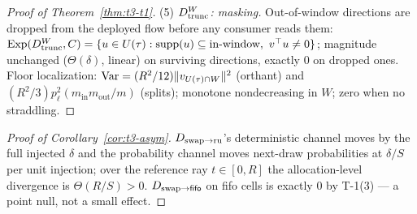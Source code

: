 \begin{proof}[Proof of Theorem~\ref{thm:t3-t1}]
(5) \emph{$\Dtrunc[W]$: masking.} Out-of-window directions are dropped from
the deployed flow before any consumer reads them:
$\Exp(\Dtrunc[W], \Ccons) = \{u \in \Utau : \mathrm{supp}(u) \subseteq
\text{in-window},\ v^{\top}u \ne 0\}$; magnitude unchanged
($\Theta(\delta)$, linear) on surviving directions, exactly 0 on dropped
ones. Floor localization: $\mathrm{Var} = (R^2/12)\|v_{\Utau \cap W}\|^2$ (orthant)
and $(R^2/3)p_\ell^2(m_{\mathrm{in}}m_{\mathrm{out}}/m)$ (splits);
monotone nondecreasing in $W$; zero when no straddling.
\end{proof}

\begin{proof}[Proof of Corollary~\ref{cor:t3-asym}]
$\Dswapru$'s deterministic channel moves  by the full
injected $\delta$ and the probability channel moves next-draw probabilities
at $\delta/S$ per unit injection; over the reference ray $t \in [0,R]$ the
allocation-level divergence is $\Theta(R/S) > 0$. $\Dswapfifo$ on fifo cells
is exactly 0 by T-1(3) --- a point null, not a small effect.
\end{proof}

